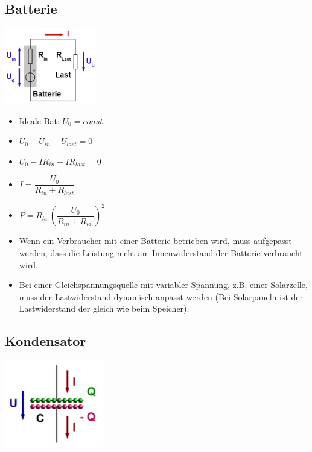 \documentclass[8pt,a4paper]{scrartcl}
\begin{document}
\begin{multicols*}{3}
		\subsection{Batterie}
			\begin{multicols*}{2}
				\includegraphics[height=3.3cm]{img/batterie.png} \\
				\begin{itemize}\itemsep0pt
					\item Ideale Bat: $U_{0}=const.$				
					\item $U_{0}-U_{in}-U_{last} =0$
					\item $U_{0}-IR_{in}-IR_{last} =0$
					\item $I=\dfrac{U_{0}}{R_{in}+R_{last}}$
					\item $P=R_{la.}(\dfrac{U_{0}}{R_{in}+R_{la.}})^{2}$
				\end{itemize}
			\end{multicols*}
			\begin{itemize}\itemsep0pt
				\item Wenn ein Verbraucher mit einer Batterie betrieben wird, muss aufgepasst werden, dass die Leistung nicht am Innenwiderstand der Batterie verbraucht wird.
				\item Bei einer Gleichspannungsquelle mit variabler Spannung, z.B. einer Solarzelle, muss der Lastwiderstand dynamisch anpasst werden (Bei Solarpaneln ist der Lastwiderstand der gleich wie beim Speicher).			
			\end{itemize}
			
		\subsection{Kondensator}
			\begin{multicols*}{2}
				\includegraphics[height=3.8cm]{img/kondensator1.png} 
				

\end{multicols*}
\end{multicols*}
\end{document}

